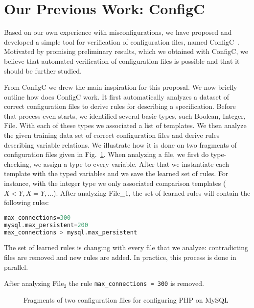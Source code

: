 \section{Our Previous Work: ConfigC}
\label{sec:prelim}

Based on our own experience with misconfigurations,
we have proposed and developed a simple tool for verification of 
configuration files, named
ConfigC~\cite{santolucitoCAV}. Motivated by promising preliminary
results, which we obtained with ConfigC, we believe that automated 
verification of configuration files is possible and that it should be further studied.

From ConfigC we drew the main inspiration for this proposal. We now briefly
outline how does ConfigC work. It first automatically
analyzes a dataset of correct configuration files to derive
 rules for describing a specification. Before that process even starts,
we identified several basic types, 
such Boolean, Integer, File. With each of these types we associated a 
list of templates. We then analyze the given training data set of 
correct configuration files and derive rules describing variable 
relations. We illustrate how it is done on two fragments of configuration 
files given in Fig.~\ref{fig:twoFiles}.  When analyzing
a file, we first do type-checking, \ie we assign a type to every variable. After that we instantiate each template with the typed variables and we save the learned set 
of rules. For instance, with the integer type we only associated comparison templates ($X < Y, X = Y, \ldots$). After 
analyzing File\_1, the set of learned rules will contain the following rules:
\begin{lstlisting}[language=C, xleftmargin=.01\textwidth]
max_connections=300
mysql.max_persistent=200
max_connections > mysql.max_persistent
\end{lstlisting}
The set of learned rules is changing with every file that we analyze: contradicting 
files are removed and new rules are added. In practice, this process is done 
in parallel. 

After analyzing File$_2$ the rule \texttt{max\_connections = 300} is removed. 

\begin{figure}
	\centering
\begin{minipage}{0.9\textwidth}
\begin{parcolumns}{2}


\colplacechunks
\end{parcolumns}
\end{minipage}
	\caption{Fragments of two configuration files for configuring PHP on MySQL}
	\label{fig:twoFiles}
\end{figure}


